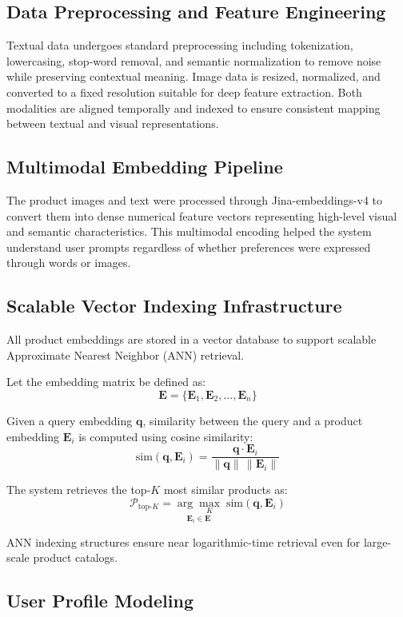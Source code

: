 \documentclass[conference]{IEEEtran}
\begin{document}
\subsection{Data Preprocessing and Feature Engineering}

Textual data undergoes standard preprocessing including tokenization, lowercasing, stop-word removal, and semantic normalization to remove noise while preserving contextual meaning. Image data is resized, normalized, and converted to a fixed resolution suitable for deep feature extraction. Both modalities are aligned temporally and indexed to ensure consistent mapping between textual and visual representations.

\subsection{Multimodal Embedding Pipeline}

The product images and text were processed through
Jina-embeddings-v4 to convert them into dense
numerical feature vectors representing high-level visual
and semantic characteristics. This multimodal encoding
helped the system understand user prompts regardless
of whether preferences were expressed through words
or images.

\subsection{Scalable Vector Indexing Infrastructure}
All product embeddings are stored in a vector database to support scalable
Approximate Nearest Neighbor (ANN) retrieval.

Let the embedding matrix be defined as:
\[
\mathbf{E} = \{ \mathbf{E}_1, \mathbf{E}_2, \ldots, \mathbf{E}_n \}
\]

Given a query embedding $\mathbf{q}$, similarity between the query and a
product embedding $\mathbf{E}_i$ is computed using cosine similarity:
\[
\mathrm{sim}(\mathbf{q}, \mathbf{E}_i) =
\frac{\mathbf{q} \cdot \mathbf{E}_i}
{\lVert \mathbf{q} \rVert \, \lVert \mathbf{E}_i \rVert}
\]

The system retrieves the top-$K$ most similar products as:
\[
\mathcal{P}_{\text{top-}K}
=
\underset{\mathbf{E}_i \in \mathbf{E}}{\arg\max_{K}}
\; \mathrm{sim}(\mathbf{q}, \mathbf{E}_i)
\]

ANN indexing structures ensure near logarithmic-time retrieval even for
large-scale product catalogs.


\subsection{User Profile Modeling}
\end{document}
